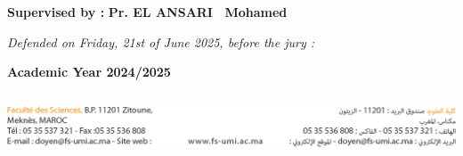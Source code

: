 \documentclass[a4paper,12pt]{report}
\begin{document}
\begin{titlepage}
\begin{center}
\begin{flushleft}
        \end{flushleft}
        \begin{flushleft}
              \textbf{Supervised by :} \hspace{1cm} \textbf{Pr. \textsc{EL ANSARI } ~Mohamed} \hspace{2cm}
            \end{flushleft}

    \begin{flushleft}
         {\large \textit{Defended on Friday, 21st of June 2025, before the jury : }}\\[0.5cm]
    \end{flushleft}


    \bf \large{Academic Year 2024/2025 } \\[3.2cm]

        \begin{minipage}{17cm}
    	\begin{center}
    		\includegraphics[width=17cm,height=2cm]{Pics/FooterUMI.png}
    	\end{center}
    \end{minipage}

    \end{center}
\end{titlepage}
\end{document}

